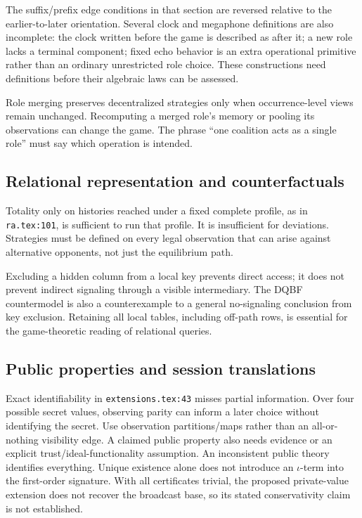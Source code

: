 \documentclass[11pt]{article}
\begin{document}
The suffix/prefix edge conditions in that section are reversed relative to the
earlier-to-later orientation. Several clock and megaphone definitions are also
incomplete: the clock written before the game is described as after it; a new
role lacks a terminal component; fixed echo behavior is an extra operational
primitive rather than an ordinary unrestricted role choice. These constructions
need definitions before their algebraic laws can be assessed.

Role merging preserves decentralized strategies only when occurrence-level views
remain unchanged. Recomputing a merged role's memory or pooling its observations
can change the game. The phrase ``one coalition acts as a single role'' must say
which operation is intended.

\subsection{Relational representation and counterfactuals}

Totality only on histories reached under a fixed complete profile, as in
\texttt{ra.tex:101}, is sufficient to run that profile. It is insufficient for
deviations. Strategies must be defined on every legal observation that can arise
against alternative opponents, not just the equilibrium path.

Excluding a hidden column from a local key prevents direct access; it does not
prevent indirect signaling through a visible intermediary. The DQBF countermodel
is also a counterexample to a general no-signaling conclusion from key exclusion.
Retaining all local tables, including off-path rows, is essential for the
game-theoretic reading of relational queries.

\subsection{Public properties and session translations}

Exact identifiability in \texttt{extensions.tex:43} misses partial information.
Over four possible secret values, observing parity can inform a later choice
without identifying the secret. Use observation partitions/maps rather than an
all-or-nothing visibility edge. A claimed public property also needs evidence
or an explicit trust/ideal-functionality assumption. An inconsistent public
theory identifies everything. Unique existence alone does not introduce an
$\iota$-term into the first-order signature. With all certificates trivial,
the proposed private-value extension does not recover the broadcast base, so its
stated conservativity claim is not established.
\end{document}
